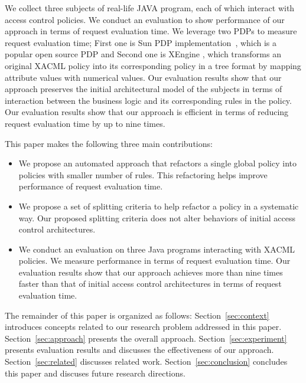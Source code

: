 
We collect three subjects of real-life JAVA program, each of which interact
with access control policies. 
We conduct an evaluation to show performance of our approach in terms of request evaluation time.
We leverage two PDPs to measure request evaluation time; First one is
Sun PDP implementation~\cite{oasis}, which is a popular open source PDP and Second one is 
XEngine \cite{Xengine}, which transforms an original XACML policy
into its corresponding policy in a tree format by mapping attribute values with numerical values.
Our evaluation results show that our approach
preserves the initial architectural model of the subjects in terms of interaction between the business logic and its corresponding
rules in the policy. Our evaluation results show that our approach
is efficient in terms of reducing request evaluation time by up to nine times. 



This paper makes the following three main contributions:
\begin{itemize}
\item We propose an automated approach that refactors a single global policy into policies with smaller number of rules. This
refactoring helps improve performance of request evaluation time.
\item We propose a set of splitting criteria to help refactor a policy in a systematic way. Our proposed splitting criteria does not alter behaviors of initial access control architectures.
\item We conduct an evaluation on three Java programs interacting with XACML policies. We measure performance in terms
of request evaluation time. 
Our evaluation results show that our approach achieves more than nine times faster than that of initial access control architectures in terms of request evaluation time.
\end{itemize}


The remainder of this paper is organized as follows: Section~\ref{sec:context} introduces concepts related to our research problem addressed in this paper.
Section~\ref{sec:approach} presents the overall approach. 
Section~\ref{sec:experiment} presents evaluation results and discusses the effectiveness of our approach. Section~\ref{sec:related} discusses related work.
Section~\ref{sec:conclusion} concludes this paper and discuses future research directions.

